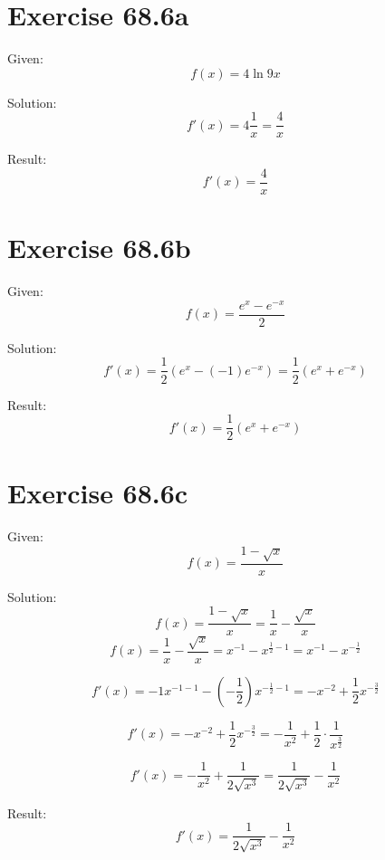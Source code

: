 \documentclass[a4paper, 10pt]{scrartcl}
\begin{document}
\section{Exercise 68.6a}

Given:
\[f(x) = 4\ln{9x}\]

Solution:
\[f'(x) = 4\frac{1}{x} = \frac{4}{x}\]

Result:
\[f'(x) = \frac{4}{x}\]

\section{Exercise 68.6b}

Given:
\[f(x) = \frac{e^{x} - e^{-x}}{2}\]

Solution:
\[f'(x) = \frac{1}{2}(e^{x} - (-1)e^{-x}) = \frac{1}{2}(e^{x} + e^{-x})\]

Result:
\[f'(x) = \frac{1}{2}(e^{x} + e^{-x})\]

\section{Exercise 68.6c}

Given:
\[f(x) = \frac{1 - \sqrt{x}}{x}\]

Solution:
\[f(x) = \frac{1 - \sqrt{x}}{x} = \frac{1}{x} - \frac{\sqrt{x}}{x}\]
\[f(x) = \frac{1}{x} - \frac{\sqrt{x}}{x} = x^{-1} - x^{\frac{1}{2} - 1} =
         x^{-1} - x^{-\frac{1}{2}}\]

\[f'(x) = -1x^{-1 - 1} - (-\frac{1}{2})x^{-\frac{1}{2} - 1} =
          -x^{-2} + \frac{1}{2}x^{-\frac{3}{2}}\]

\[f'(x) = -x^{-2} + \frac{1}{2}x^{-\frac{3}{2}} =
           -\frac{1}{x^{2}} + \frac{1}{2}\cdot\frac{1}{x^{\frac{3}{2}}}\]

\[f'(x) = -\frac{1}{x^{2}} + \frac{1}{2\sqrt{x^{3}}} = \frac{1}{2\sqrt{x^{3}}} - \frac{1}{x^{2}}\]

Result:
\[f'(x) = \frac{1}{2\sqrt{x^{3}}} - \frac{1}{x^{2}}\]
\end{document}
